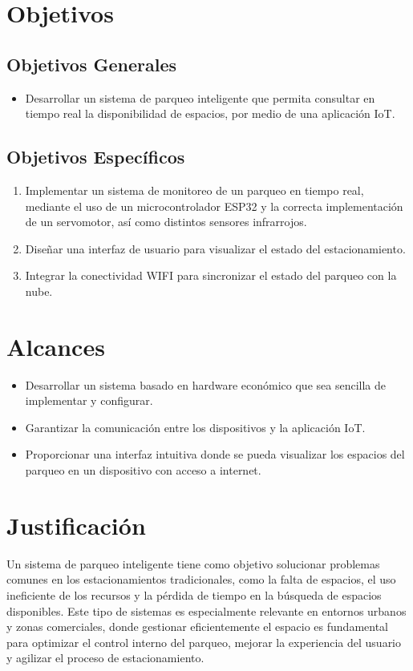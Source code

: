 \documentclass[12pt,a4paper]{article}
\begin{document}
\section{Objetivos}

\subsection{Objetivos Generales}
\begin{itemize}
    \item Desarrollar un sistema de parqueo inteligente que permita consultar en tiempo real la disponibilidad de espacios, por medio de una aplicación IoT.
\end{itemize}


\subsection{Objetivos Específicos}
\begin{enumerate}
    \item Implementar un sistema de monitoreo de un parqueo en tiempo real, mediante el uso de un microcontrolador ESP32 y la correcta implementación de un servomotor, así como distintos sensores infrarrojos.
    \item Diseñar una interfaz de usuario para visualizar el estado del estacionamiento. 
    \item Integrar la conectividad WIFI para sincronizar el estado del parqueo con la nube. 
\end{enumerate}


\section{Alcances}
\begin{itemize}
    \item Desarrollar un sistema basado en hardware económico que sea sencilla de implementar y configurar.
    \item Garantizar la comunicación entre los dispositivos y la aplicación IoT. 
    \item Proporcionar una interfaz intuitiva donde se pueda visualizar los espacios del parqueo en un dispositivo con acceso a internet.
\end{itemize}

\section{Justificación}
Un sistema de parqueo inteligente tiene como objetivo solucionar problemas comunes en los estacionamientos tradicionales, como la falta de espacios, el uso ineficiente de los recursos y la pérdida de tiempo en la búsqueda de espacios disponibles. Este tipo de sistemas es especialmente relevante en entornos urbanos y zonas comerciales, donde gestionar eficientemente el espacio es fundamental para optimizar el control interno del parqueo, mejorar la experiencia del usuario y agilizar el proceso de estacionamiento.
\end{document}
